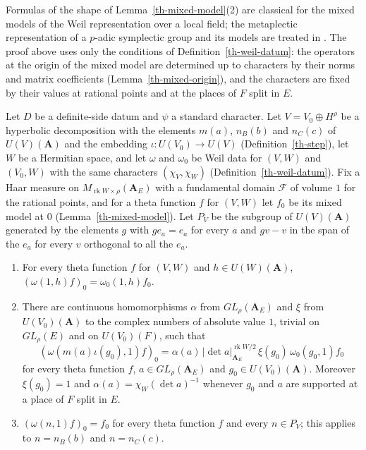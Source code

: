 \begin{remark}\label{th-mixed-model-literature}
Formulas of the shape of Lemma~\ref{th-mixed-model}(2) are classical for the
mixed models of the Weil representation over a local field; the metaplectic
representation of a $p$-adic symplectic group and its models are treated in
\cite{MVW87}. The proof above uses only the conditions of
Definition~\ref{th-weil-datum}: the operators at the origin of the mixed model
are determined up to characters by their norms and matrix coefficients
(Lemma~\ref{th-mixed-origin}), and the characters are fixed by their values at
rational points and at the places of $F$ split in $E$.
\end{remark}

\begin{lemma}\label{th-mixed-origin}
Let $D$ be a definite-side datum and $\psi$ a standard character. Let
$V=V_0\oplus H^\rho$ be a hyperbolic decomposition with the elements $m(a)$,
$n_B(b)$ and $n_C(c)$ of $U(V)(\mathbf A)$ and the embedding
$\iota\colon U(V_0)\to U(V)$ (Definition~\ref{th-step}), let $W$ be a Hermitian
space, and let $\omega$ and $\omega_0$ be Weil data for $(V,W)$ and $(V_0,W)$
with the same characters $(\chi_V,\chi_W)$ (Definition~\ref{th-weil-datum}).
Fix a Haar measure on $M_{\operatorname{rk}W\times\rho}(\mathbf A_E)$ with a
fundamental domain $\mathcal F$ of volume $1$ for the rational points, and for
a theta function $f$ for $(V,W)$ let $f_0$ be its mixed model at $0$
(Lemma~\ref{th-mixed-model}). Let $P_V$ be the subgroup of
$U(V)(\mathbf A)$ generated by the elements $g$ with $ge_a=e_a$ for every $a$
and $gv-v$ in the span of the $e_a$ for every $v$ orthogonal to all the $e_a$.
\begin{enumerate}
\item For every theta function $f$ for $(V,W)$ and $h\in U(W)(\mathbf A)$,
  $(\omega(1,h)f)_0=\omega_0(1,h)f_0$.
\item There are continuous homomorphisms $\alpha$ from $GL_\rho(\mathbf A_E)$
  and $\xi$ from $U(V_0)(\mathbf A)$ to the complex numbers of absolute value
  $1$, trivial on $GL_\rho(E)$ and on $U(V_0)(F)$, such that
  \[
  (\omega(m(a)\iota(g_0),1)f)_0=\alpha(a)\,|\det a|_{\mathbf A_E}^{\operatorname{rk}W/2}\,\xi(g_0)\,\omega_0(g_0,1)f_0
  \]
  for every theta function $f$, $a\in GL_\rho(\mathbf A_E)$ and
  $g_0\in U(V_0)(\mathbf A)$. Moreover $\xi(g_0)=1$ and
  $\alpha(a)=\chi_W(\det a)^{-1}$ whenever $g_0$ and $a$ are supported at a
  place of $F$ split in $E$.
\item $(\omega(n,1)f)_0=f_0$ for every theta function $f$ and every $n\in P_V$;
  this applies to $n=n_B(b)$ and $n=n_C(c)$.
\end{enumerate}
\end{lemma}
